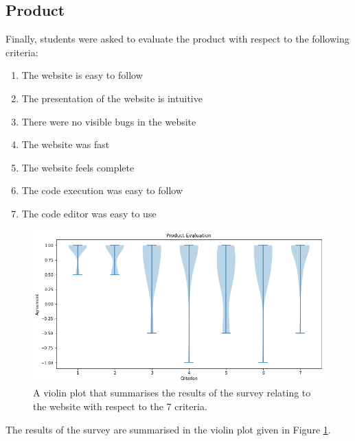 \begin{appendices}
\subsection{Product}
Finally, students were asked to evaluate the product with respect to the following criteria:
\begin{enumerate}
    \item The website is easy to follow
    \item The presentation of the website is intuitive
    \item There were no visible bugs in the website
    \item The website was fast
    \item The website feels complete
    \item The code execution was easy to follow
    \item The code editor was easy to use
\end{enumerate}
 \begin{figure}[htb]
    \centering
    \includegraphics[scale=0.3]{images/website-evaluation.png}
    \caption{A violin plot that summarises the results of the survey relating to the website with respect to the 7 criteria.}
    \label{fig:website-evaluation}
\end{figure}
The results of the survey are summarised in the violin plot given in Figure \ref{fig:website-evaluation}. 



\end{appendices}
